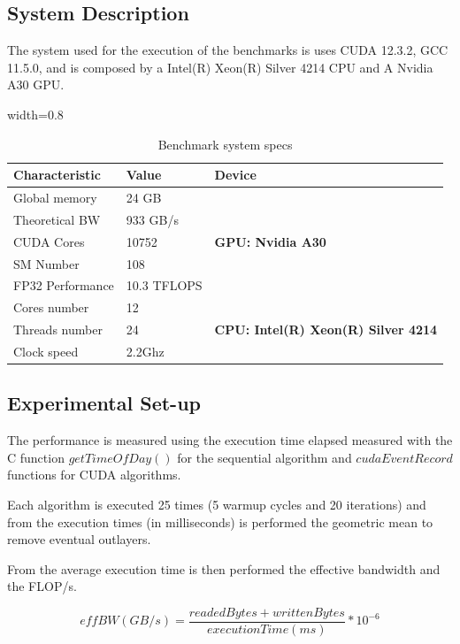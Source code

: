\documentclass[conference]{IEEEtran}
\begin{document}
\subsection{System Description}
The system used for the execution of the benchmarks is uses CUDA 12.3.2, GCC 11.5.0, and is composed by a Intel(R) Xeon(R) Silver 4214 CPU and A Nvidia A30 GPU.  

\begin{table}[h]
    \centering
    \begin{adjustbox}{width=0.8\columnwidth}
    \begin{tabular}{lll}
    \toprule
    \textbf{Characteristic} & \textbf{Value} & \textbf{Device}\\
    \midrule
    Global memory & 24 GB &  \multirow{5}{*}{\textbf{GPU: Nvidia A30}} \\
    Theoretical BW & 933 GB/s \\
    CUDA Cores & 10752 \\
    SM Number & 108 \\
    FP32 Performance & 10.3 TFLOPS \\
    \midrule 
    Cores number & 12 & \multirow{3}{*}{\textbf{CPU: Intel(R) Xeon(R) Silver 4214}} \\
    Threads number & 24 \\
    Clock speed & 2.2Ghz \\
    \bottomrule
    \end{tabular}
    \end{adjustbox}
    \vspace{1em}
    \caption{Benchmark system specs}
    \label{tab:benchmarkSystem}
\end{table}

\subsection{Experimental Set-up}
The performance is measured using the execution time elapsed measured with the C function $getTimeOfDay()$ for the sequential algorithm and $cudaEventRecord$ functions for CUDA algorithms. 

Each algorithm is executed 25 times (5 warmup cycles and 20 iterations) and from the execution times (in milliseconds) is performed the geometric mean to remove eventual outlayers. 

From the average execution time is then performed the effective bandwidth and the FLOP/s.

\begin{equation}
effBW (GB/s)=\frac{readedBytes+writtenBytes}{executionTime(ms)}*10^{-6}
\end{equation}
\end{document}
